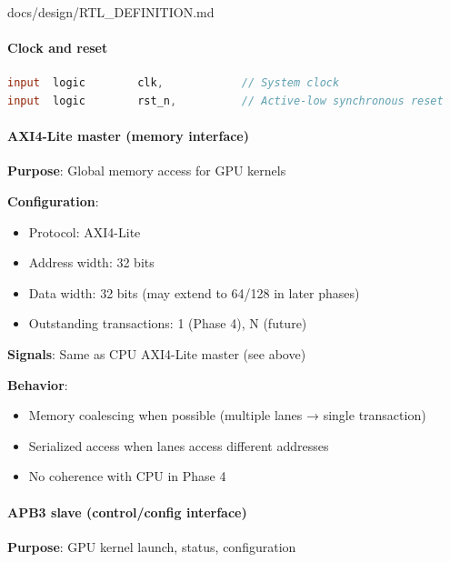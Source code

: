 \begin{relocated}{docs/design/RTL_DEFINITION.md}
\paragraph{Clock and reset}\label{ds:ch:rtl-definition:clock-and-reset-1}

\begin{lstlisting}[language=Verilog]
input  logic        clk,            // System clock
input  logic        rst_n,          // Active-low synchronous reset
\end{lstlisting}

\paragraph{AXI4-Lite master (memory interface)}\label{ds:ch:rtl-definition:axi4-lite-master-memory-interface-1}

\textbf{Purpose}: Global memory access for GPU kernels

\textbf{Configuration}:

\begin{itemize}
\tightlist
\item
  Protocol: AXI4-Lite
\item
  Address width: 32 bits
\item
  Data width: 32 bits (may extend to 64/128 in later phases)
\item
  Outstanding transactions: 1 (Phase 4), N (future)
\end{itemize}

\textbf{Signals}: Same as CPU AXI4-Lite master (see above)

\textbf{Behavior}:

\begin{itemize}
\tightlist
\item
  Memory coalescing when possible (multiple lanes → single transaction)
\item
  Serialized access when lanes access different addresses
\item
  No coherence with CPU in Phase 4
\end{itemize}

\paragraph{\texorpdfstring{APB3 slave (control/\allowbreak{}config
interface)}{APB3 slave (control/config interface)}}\label{ds:ch:rtl-definition:apb3-slave-controlconfig-interface}

\textbf{Purpose}: GPU kernel launch, status, configuration


\end{relocated}
